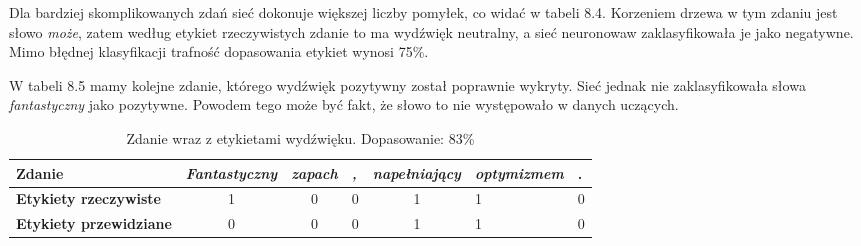 Dla bardziej skomplikowanych zdań sieć dokonuje większej liczby pomyłek, co widać w tabeli 8.4. Korzeniem drzewa w tym zdaniu jest słowo \textit{może}, zatem według etykiet rzeczywistych zdanie to ma wydźwięk neutralny, a sieć neuronowaw zaklasyfikowała je jako negatywne. Mimo błędnej klasyfikacji trafność dopasowania etykiet wynosi 75\%.
\begin{table}[H]
\centering
{}
\caption{Zdanie wraz z etykietami wydźwięku. Dopasowanie: 75\% }
\label{table:bf-sa}
\end{table}
W tabeli 8.5 mamy kolejne zdanie, którego wydźwięk pozytywny został poprawnie wykryty. Sieć jednak nie zaklasyfikowała słowa \textit{fantastyczny} jako pozytywne. Powodem tego może być fakt, że słowo to nie występowało w danych uczących.

\begin{table}[H]
\centering
\begin{tabular}{|l|c|c|l|c|l|l|}
\hline

\textbf{Zdanie}                & \textit{Fantastyczny} & \textit{zapach} & \textit{,} & \textit{napełniający} & \textit{optymizmem} & . \\ \hline
\textbf{Etykiety rzeczywiste}  & 1                     & 0               & 0          & 1                     & 1                   & 0 \\ \hline
\textbf{Etykiety przewidziane} & 0                     & 0               & 0          & 1                     & 1                   & 0 \\ \hline
\end{tabular}
\caption{Zdanie wraz z etykietami wydźwięku. Dopasowanie: 83\%}
\label{table:bf-sa}
\end{table}

